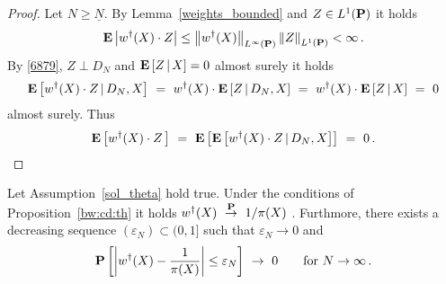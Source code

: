 \begin{proof}
  Let
  $N\ge\underline{N}$.
  By Lemma~\ref{weights_bounded} and 
  $Z\in L^1(\P)$
  it holds
  \begin{gather}
    \label{6879}
  \E
  \left|
  w^\dagger(X)\cdot Z
  \right|
  \le
  \norm{w^\dagger(X)}_{L^\infty(\P)}
  \norm{Z}_{L^1(\P)}
  <\infty
  \,.
  \end{gather}
  By 
  \eqref{6879},
  $Z\perp D_N$
  and
  $
\E
\left[
  Z
  \,
  |
  \, 
  X
\right]
= 0
  $
  almost surely
  it holds 
  \begin{gather*}
    \E
  \left[
  w^\dagger(X)
  \cdot
  Z
  \,
  |
  \,
  D_N,X
  \right]
  \ 
  =
  \ 
  w^\dagger(X)
  \cdot
  \E
  \left[
  Z
  \,
  |
  \,
  D_N,X
  \right]
  \ 
  =
  \ 
  w^\dagger(X)
  \cdot
  \E
  \left[
  Z
  \,
  |
  \,
  X
  \right]
  \
  =
  \ 
  0
  \end{gather*}
  almost surely.
  Thus
  \begin{gather*}
    \E
    \left[
  w^\dagger(X)
  \cdot
  Z
  \,
    \right]
    \ 
    =
    \ 
    \E
    \left[
 \E
  \left[
  w^\dagger(X)
  \cdot
  Z
  \,
  |
  \,
  D_N,X
  \right]
    \right]
    \ 
    =
    \ 
    0
    \,.
     \end{gather*}
\end{proof}
\begin{ftheorem}
  \label{aa:weights:th}
  Let Assumption~\ref{sol_theta} hold true.
  Under the conditions of Proposition~\ref{bw:cd:th} 
  it holds
  $w^\dagger(X)\ 
  \overset{\P}{\to}
  \ 
  1/\pi(X)
  $
  .
  Furthmore, there exists a decreasing sequence $(\varepsilon_N)\subset(0,1]$ such that $\varepsilon_N\to 0$ and 
  \begin{gather}
    \P
    \left[ 
  \left| 
  w^\dagger(X)
  -
  \frac{1}{\pi(X)}
  \right|
    \le
    \varepsilon_N
    \right]
  \  
  \to
  \  
  0
  \qquad
  \text{for}
  \ 
  N\to\infty
  \,.
  \end{gather}
\end{ftheorem}
